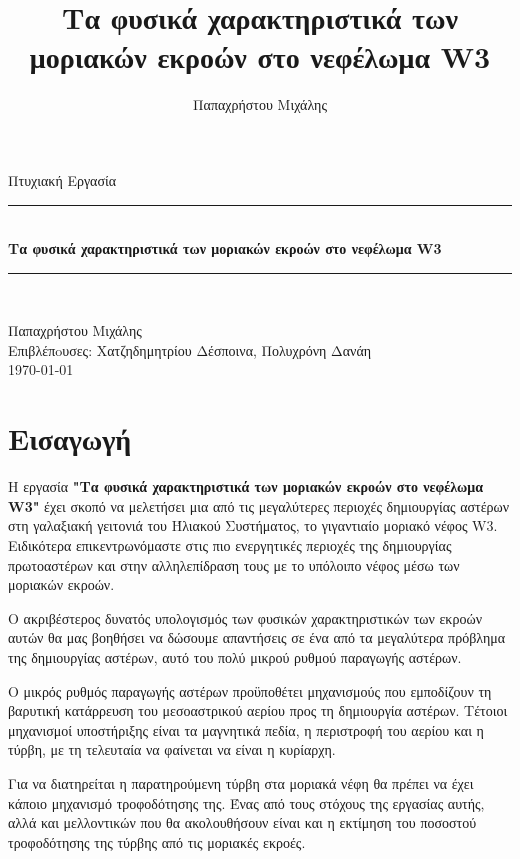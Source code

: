 \documentclass[a4paper,12pt]{memoir}
\title{Τα φυσικά χαρακτηριστικά των μοριακών εκροών στο νεφέλωμα W3}
\author{Παπαχρήστου Μιχάλης}
\newcommand{\HRule}{\rule{\linewidth}{0.5mm}}
\begin{document}
\begin{titlingpage}
	\begin{center}

		\bigskip
		\bigskip
		\bigskip
{\Large Πτυχιακή Εργασία}
\smallskip
		\HRule \\[0.4cm]
		{ \huge \bfseries Τα φυσικά χαρακτηριστικά των μοριακών εκροών στο νεφέλωμα W3 \\[0.4cm] }
		\HRule \\[1.5cm]
		\medskip
		
		\vfill
		
\noindent
{\Large Παπαχρήστου Μιχάλης} \\
\bigskip
\bigskip
{\large Επιβλέπoυσες:  Χατζηδημητρίου Δέσποινα, Πολυχρόνη Δανάη} \\
\bigskip
{ \today}

	\end{center}
\end{titlingpage}

\tableofcontents


\chapter*{Εισαγωγή}
Η εργασία \textbf{"Τα φυσικά χαρακτηριστικά των μοριακών εκροών στο νεφέλωμα W3"} έχει σκοπό να μελετήσει μια από τις μεγαλύτερες περιοχές δημιουργίας αστέρων στη γαλαξιακή γειτονιά του Ήλιακού Συστήματος, το γιγαντιαίο μοριακό νέφος W3. 
Ειδικότερα επικεντρωνόμαστε στις πιο ενεργητικές περιοχές της δημιουργίας πρωτοαστέρων και στην αλληλεπίδραση τους με το υπόλοιπο νέφος μέσω των μοριακών εκροών. 

O ακριβέστερος δυνατός υπολογισμός των φυσικών χαρακτηριστικών των εκροών αυτών θα μας βοηθήσει να δώσουμε απαντήσεις σε ένα από τα μεγαλύτερα πρόβλημα της δημιουργίας αστέρων, αυτό του πολύ μικρού ρυθμού παραγωγής αστέρων. 

Ο μικρός ρυθμός παραγωγής αστέρων προϋποθέτει μηχανισμούς που εμποδίζουν τη βαρυτική κατάρρευση του μεσοαστρικού αερίου προς τη δημιουργία αστέρων. Τέτοιοι μηχανισμοί υποστήριξης είναι τα μαγνητικά πεδία, η περιστροφή του αερίου και η τύρβη, με τη τελευταία να φαίνεται να είναι η κυρίαρχη.

Για να διατηρείται η παρατηρούμενη τύρβη στα μοριακά νέφη θα πρέπει να έχει κάποιο μηχανισμό τροφοδότησης της. Ένας από τους στόχους της εργασίας αυτής, αλλά και μελλοντικών που θα ακολουθήσουν είναι και η εκτίμηση του ποσοστού τροφοδότησης της τύρβης από τις μοριακές εκροές. 
\end{document}
